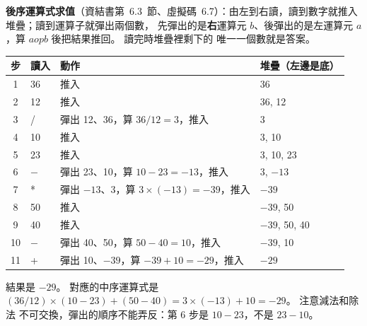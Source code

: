 \begin{pastsoln}
\textbf{後序運算式求值}（資結書第~6.3~節、虛擬碼~6.7）：由左到右讀，讀到數字就推入堆疊；讀到運算子就彈出兩個數，
先彈出的是\textbf{右}運算元 $b$、後彈出的是左運算元 $a$，算 $a \mathbin{\mathit{op}} b$ 後把結果推回。 讀完時堆疊裡剩下的
唯一一個數就是答案。
\begin{center}
\begin{tabular}{clll}
\toprule
步 & 讀入 & 動作 & 堆疊（左邊是底） \\
\midrule
1 & 36 & 推入 & 36 \\
2 & 12 & 推入 & 36, 12 \\
3 & / & 彈出 12、36，算 $36 / 12 = 3$，推入 & 3 \\
4 & 10 & 推入 & 3, 10 \\
5 & 23 & 推入 & 3, 10, 23 \\
6 & $-$ & 彈出 23、10，算 $10 - 23 = -13$，推入 & 3, $-13$ \\
7 & * & 彈出 $-13$、3，算 $3 \times (-13) = -39$，推入 & $-39$ \\
8 & 50 & 推入 & $-39$, 50 \\
9 & 40 & 推入 & $-39$, 50, 40 \\
10 & $-$ & 彈出 40、50，算 $50 - 40 = 10$，推入 & $-39$, 10 \\
11 & + & 彈出 10、$-39$，算 $-39 + 10 = -29$，推入 & $-29$ \\
\bottomrule
\end{tabular}
\end{center}
結果是 $-29$。 對應的中序運算式是 $(36 / 12) \times (10 - 23) + (50 - 40) = 3 \times (-13) + 10 = -29$。 注意減法和除法
不可交換，彈出的順序不能弄反：第 6 步是 $10 - 23$，不是 $23 - 10$。
\end{pastsoln}
